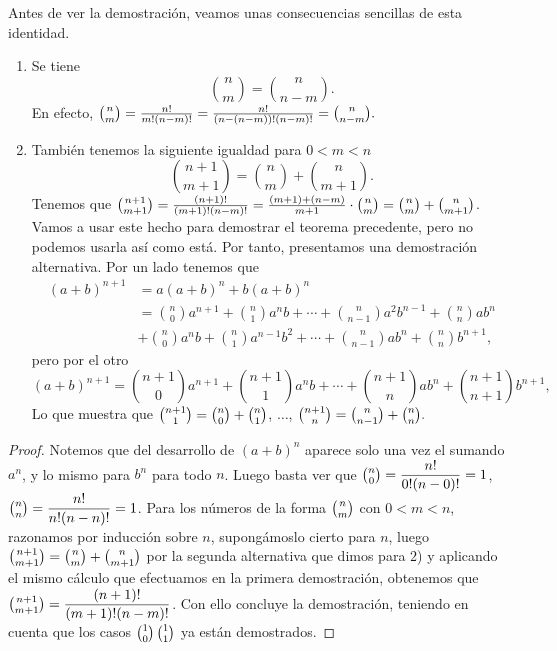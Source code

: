 \documentclass{article}
\theoremstyle{plain}
\theoremstyle{definition}
\begin{document}
Antes de ver la demostración, veamos unas consecuencias sencillas de esta identidad.
\begin{enumerate}
    \item Se tiene
    \[
    \binom{n}{m} = \binom{n}{n-m}.
    \]
    En efecto, $\tbinom{n}{m} = \frac{n!}{m!(n-m)!} = \frac{n!}{(n-(n-m))!(n-m)!} = \tbinom{n}{n-m}.$
    
    \item También tenemos la siguiente igualdad para $0 < m < n$
    \[
    \binom{n+1}{m+1} = \binom{n}{m} + \binom{n}{m+1}.
    \]
    Tenemos que $\tbinom{n+1}{m+1} = \frac{(n+1)!}{(m+1)!(n-m)!} = \frac{(m+1)+(n-m)}{m+1}\cdot\tbinom{n}{m} = \tbinom{n}{m} + \tbinom{n}{m+1}$.
    Vamos a usar este hecho para demostrar el teorema precedente, pero no podemos usarla así como está.
    Por tanto, presentamos una demostración alternativa.
    Por un lado tenemos que 
    \begin{align*}
    (a+b)^{n+1} &= a(a+b)^n + b(a+b)^n \\
    &= \binom{n}{0}a^{n+1} + \binom{n}{1}a^nb + \cdots + \binom{n}{n-1}a^2b^{n-1} + \binom{n}{n}ab^n \\
    &+ \binom{n}{0}a^nb + \binom{n}{1}a^{n-1}b^2 + \cdots + \binom{n}{n-1}ab^n + \binom{n}{n}b^{n+1},
    \end{align*}
    pero por el otro 
    \[
    (a+b)^{n+1} = \binom{n+1}{0}a^{n+1} + \binom{n+1}{1}a^nb + \cdots + \binom{n+1}{n}ab^n + \binom{n+1}{n+1}b^{n+1},
    \]
    Lo que muestra que $\tbinom{n+1}{1} = \tbinom{n}{0} + \tbinom{n}{1}$, $\dots$, $\tbinom{n+1}{n} = \tbinom{n}{n-1} + \tbinom{n}{n}.$
\end{enumerate}

\begin{proof}
    Notemos que del desarrollo de $(a+b)^n$ aparece solo una vez el sumando $a^n$, y lo mismo para $b^n$ para todo $n$. Luego
    basta ver que $\displaystyle\tbinom{n}{0} = \frac{n!}{0!(n-0)!} = 1$, $\displaystyle\tbinom{n}{n} = \frac{n!}{n!(n-n)!} = 1$.
    Para los números de la forma $\tbinom{n}{m}$ con $0 < m < n$, razonamos por inducción sobre $n$, supongámoslo 
    cierto para $n$, luego $\tbinom{n+1}{m+1} = \tbinom{n}{m} + \tbinom{n}{m+1}$ por la segunda alternativa
    que dimos para $2$) y aplicando el mismo cálculo que efectuamos en la primera demostración, obtenemos que
    $\displaystyle\tbinom{n+1}{m+1} = \frac{(n+1)!}{(m+1)!(n-m)!}$. Con ello concluye la demostración, teniendo en cuenta
    que los casos $\tbinom{1}{0}\, \tbinom{1}{1}$ ya están demostrados.
\end{proof}
\end{document}
